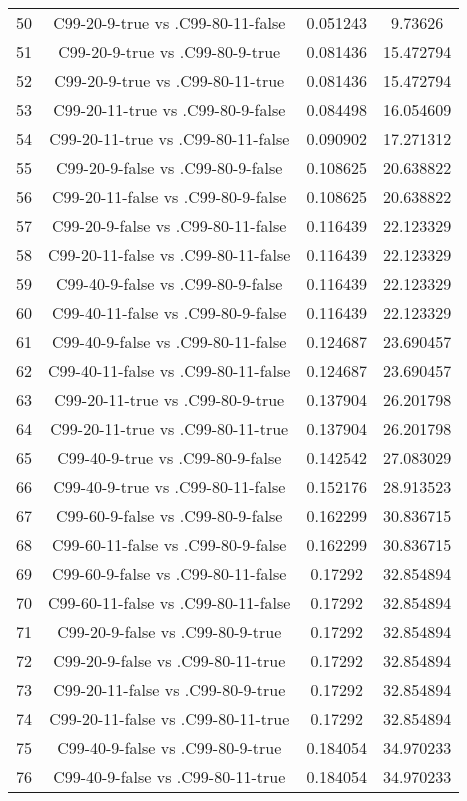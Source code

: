\documentclass[a4paper,10pt]{article}
\begin{document}
\begin{landscape}
\begin{table}[!htp]
\begin{tabular}{cccc}
50&C99-20-9-true vs .C99-80-11-false&0.051243&9.73626\\
51&C99-20-9-true vs .C99-80-9-true&0.081436&15.472794\\
52&C99-20-9-true vs .C99-80-11-true&0.081436&15.472794\\
53&C99-20-11-true vs .C99-80-9-false&0.084498&16.054609\\
54&C99-20-11-true vs .C99-80-11-false&0.090902&17.271312\\
55&C99-20-9-false vs .C99-80-9-false&0.108625&20.638822\\
56&C99-20-11-false vs .C99-80-9-false&0.108625&20.638822\\
57&C99-20-9-false vs .C99-80-11-false&0.116439&22.123329\\
58&C99-20-11-false vs .C99-80-11-false&0.116439&22.123329\\
59&C99-40-9-false vs .C99-80-9-false&0.116439&22.123329\\
60&C99-40-11-false vs .C99-80-9-false&0.116439&22.123329\\
61&C99-40-9-false vs .C99-80-11-false&0.124687&23.690457\\
62&C99-40-11-false vs .C99-80-11-false&0.124687&23.690457\\
63&C99-20-11-true vs .C99-80-9-true&0.137904&26.201798\\
64&C99-20-11-true vs .C99-80-11-true&0.137904&26.201798\\
65&C99-40-9-true vs .C99-80-9-false&0.142542&27.083029\\
66&C99-40-9-true vs .C99-80-11-false&0.152176&28.913523\\
67&C99-60-9-false vs .C99-80-9-false&0.162299&30.836715\\
68&C99-60-11-false vs .C99-80-9-false&0.162299&30.836715\\
69&C99-60-9-false vs .C99-80-11-false&0.17292&32.854894\\
70&C99-60-11-false vs .C99-80-11-false&0.17292&32.854894\\
71&C99-20-9-false vs .C99-80-9-true&0.17292&32.854894\\
72&C99-20-9-false vs .C99-80-11-true&0.17292&32.854894\\
73&C99-20-11-false vs .C99-80-9-true&0.17292&32.854894\\
74&C99-20-11-false vs .C99-80-11-true&0.17292&32.854894\\
75&C99-40-9-false vs .C99-80-9-true&0.184054&34.970233\\
76&C99-40-9-false vs .C99-80-11-true&0.184054&34.970233\\

\end{tabular}
\end{table}
\end{landscape}
\end{document}
